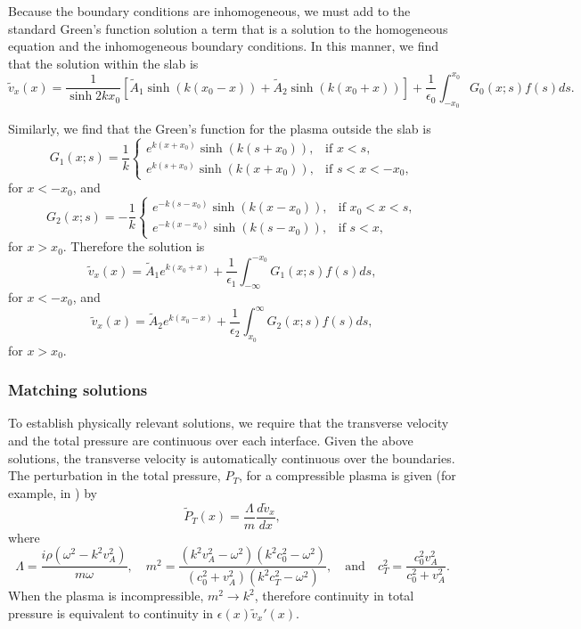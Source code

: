 \documentclass{aastex61}
\begin{document}
Because the boundary conditions are inhomogeneous, we must add to the standard Green's function solution a term that is a solution to the homogeneous equation and the inhomogeneous boundary conditions. In this manner, we find that the solution within the slab is
\begin{equation}
\tilde{v}_x(x) = \frac{1}{\sinh{2kx_0}} \left[ \tilde{A}_1\sinh(k(x_0 - x)) + \tilde{A}_2\sinh(k(x_0 + x)) \right] + \frac{1}{\epsilon_0}\int_{-x_0}^{x_0} G_0(x;s) f(s) ds.
\end{equation}

Similarly, we find that the Green's function for the plasma outside the slab is 
\begin{equation}
G_1(x;s) = \frac{1}{k}
\begin{cases}
e^{k(x + x_0)}\sinh(k(s + x_0)), & \text{if } x < s, \\
e^{k(s + x_0)}\sinh(k(x + x_0)), & \text{if } s < x < -x_0,
\end{cases}
\end{equation}
for $x < -x_0$, and
\begin{equation}
G_2(x;s) = -\frac{1}{k}
\begin{cases}
e^{-k(s - x_0)}\sinh(k(x - x_0)), & \text{if } x_0 < x < s, \\
e^{-k(x - x_0)}\sinh(k(s - x_0)), & \text{if } s < x,
\end{cases}
\end{equation}
for $x > x_0$. Therefore the solution is
\begin{equation}
\tilde{v}_x(x) = \tilde{A}_1e^{k(x_0 + x)} + \frac{1}{\epsilon_1}\int_{-\infty}^{-x_0} G_1(x;s) f(s) ds,
\end{equation}
for $x < -x_0$, and
\begin{equation}
\tilde{v}_x(x) = \tilde{A}_2e^{k(x_0 - x)} + \frac{1}{\epsilon_2}\int_{x_0}^{\infty} G_2(x;s) f(s) ds,
\end{equation}
for $x > x_0$.


\subsubsection{Matching solutions}
To establish physically relevant solutions, we require that the transverse velocity and the total pressure are continuous over each interface. Given the above solutions, the transverse velocity is automatically continuous over the boundaries. The perturbation in the total pressure, $P_T$, for a compressible plasma is given (for example, in \cite{all_etal17}) by
\begin{equation}
\tilde{P}_T(x) = \frac{\Lambda}{m}\frac{d\tilde{v}_x}{d x},
\end{equation}
where
\begin{equation}
\Lambda = \frac{i\rho(\omega^2 - k^2v_A^2)}{m\omega},
\quad
m^2 = \frac{(k^2v_A^2 - \omega^2)(k^2c_0^2 - \omega^2)}{(c_0^2 + v_A^2)(k^2c_T^2 - \omega^2)},
\quad \text{and} \quad
c_T^2 = \frac{c_0^2 v_A^2}{c_0^2 + v_A^2}.
\end{equation}
When the plasma is incompressible, $m^2 \to k^2$, therefore continuity in total pressure is equivalent to continuity in $\epsilon(x)\tilde{v}_x'(x)$.
\end{document}
